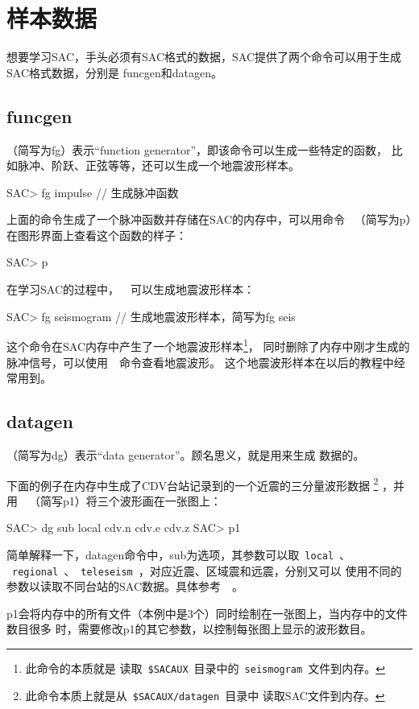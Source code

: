 \section{样本数据}

想要学习SAC，手头必须有SAC格式的数据，SAC提供了两个命令可以用于生成SAC格式数据，分别是
funcgen和datagen。

\subsection{funcgen}
（简写为fg）表示``function generator''，即该命令可以生成一些特定的函数，
比如脉冲、阶跃、正弦等等，还可以生成一个地震波形样本。
\begin{SACCode}
SAC> fg impulse         // 生成脉冲函数
\end{SACCode}
上面的命令生成了一个脉冲函数并存储在SAC的内存中，可以用命令~
（简写为p）在图形界面上查看这个函数的样子：
\begin{SACCode}
SAC> p
\end{SACCode}
在学习SAC的过程中，~~可以生成地震波形样本：
\begin{SACCode}
SAC> fg seismogram      // 生成地震波形样本，简写为fg seis
\end{SACCode}
这个命令在SAC内存中产生了一个地震波形样本\footnote{此命令的本质就是
读取~\lstinline{$SACAUX}~目录中的~\lstinline{seismogram}~文件到内存。}，
同时删除了内存中刚才生成的脉冲信号，可以使用~~命令查看地震波形。
这个地震波形样本在以后的教程中经常用到。

\subsection{datagen}
（简写为dg）表示``data generator''。顾名思义，就是用来生成
数据的。

下面的例子在内存中生成了CDV台站记录到的一个近震的三分量波形数据
\footnote{此命令本质上就是从~\lstinline{$SACAUX/datagen}~目录中
读取SAC文件到内存。}
，并用~~（简写p1）将三个波形画在一张图上：
\begin{SACCode}
SAC> dg sub local cdv.n cdv.e cdv.z
SAC> p1 
\end{SACCode}
简单解释一下，datagen命令中，sub为选项，其参数可以取~\lstinline{local}~、
~\lstinline{regional}~、~\lstinline{teleseism}~，对应近震、区域震和远震，分别又可以
使用不同的参数以读取不同台站的SAC数据。具体参考~~。

p1会将内存中的所有文件（本例中是3个）同时绘制在一张图上，当内存中的文件数目很多
时，需要修改p1的其它参数，以控制每张图上显示的波形数目。
